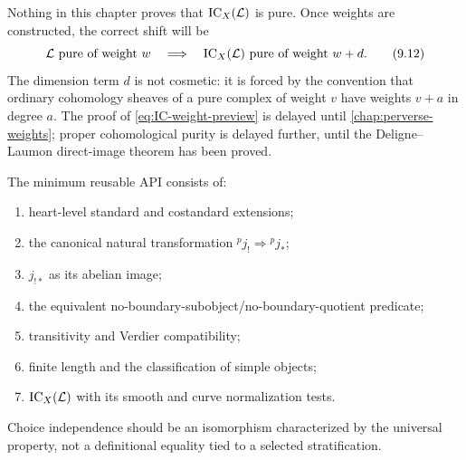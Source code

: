 Nothing in this chapter proves that \(\operatorname{IC}_X(\mathcal L)\) is pure.  Once weights are
constructed, the correct shift will be
\[
  \mathcal L\text{ pure of weight }w
  \quad\Longrightarrow\quad
  \operatorname{IC}_X(\mathcal L)\text{ pure of weight }w+d.
\tag{9.12}\label{eq:IC-weight-preview}
\]
The dimension term \(d\) is not cosmetic: it is forced by the convention that
ordinary cohomology sheaves of a pure complex of weight \(v\) have weights
\(v+a\) in degree \(a\).  The proof of \eqref{eq:IC-weight-preview} is delayed
until \cref{chap:perverse-weights}; proper cohomological purity is delayed
further, until the Deligne--Laumon direct-image theorem has been proved.

\begin{formalization}
The minimum reusable API consists of:
\begin{enumerate}
\item heart-level standard and costandard extensions;
\item the canonical natural transformation
      \({}^pj_!\Rightarrow{}^pj_*\);
\item \(j_{!*}\) as its abelian image;
\item the equivalent no-boundary-subobject/no-boundary-quotient predicate;
\item transitivity and Verdier compatibility;
\item finite length and the classification of simple objects;
\item \(\operatorname{IC}_X(\mathcal L)\) with its smooth and curve normalization tests.
\end{enumerate}
Choice independence should be an isomorphism characterized by the universal
property, not a definitional equality tied to a selected stratification.
\end{formalization}
